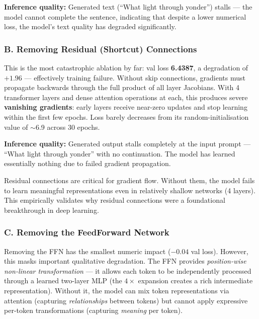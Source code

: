 \documentclass[12pt,a4paper]{article}
\newenvironment{keyinsight}{%
  \begin{tcolorbox}[colback=lightblue!70, colframe=navyblue,
    fonttitle=\bfseries\small\color{black},
    title={Key Insight}, boxrule=0.6pt,
    left=6pt, right=6pt, top=4pt, bottom=4pt, breakable]%
  \color{black}%
}{\end{tcolorbox}}
\begin{document}
\textbf{Inference quality:} Generated text (``What light through yonder'') stalls — the model cannot complete the sentence, indicating that despite a lower numerical loss, the model's text quality has degraded significantly.

\subsubsection{B. Removing Residual (Shortcut) Connections}

This is the most catastrophic ablation by far: val loss \textbf{6.4387}, a degradation of $+1.96$ — effectively training failure. Without skip connections, gradients must propagate backwards through the full product of all layer Jacobians. With 4 transformer layers and dense attention operations at each, this produces severe \textbf{vanishing gradients}: early layers receive near-zero updates and stop learning within the first few epochs. Loss barely decreases from its random-initialisation value of $\sim$6.9 across 30 epochs.

\textbf{Inference quality:} Generated output stalls completely at the input prompt — ``What light through yonder'' with no continuation. The model has learned essentially nothing due to failed gradient propagation.

\begin{keyinsight}
Residual connections are critical for gradient flow. Without them, the model fails to learn meaningful representations even in relatively shallow networks (4 layers). This empirically validates why residual connections were a foundational breakthrough in deep learning.
\end{keyinsight}

\subsubsection{C. Removing the FeedForward Network}

Removing the FFN has the smallest numeric impact ($-0.04$ val loss). However, this masks important qualitative degradation. The FFN provides \textit{position-wise non-linear transformation} — it allows each token to be independently processed through a learned two-layer MLP (the $4\times$ expansion creates a rich intermediate representation). Without it, the model can mix token representations via attention (capturing \textit{relationships} between tokens) but cannot apply expressive per-token transformations (capturing \textit{meaning} per token).
\end{document}
